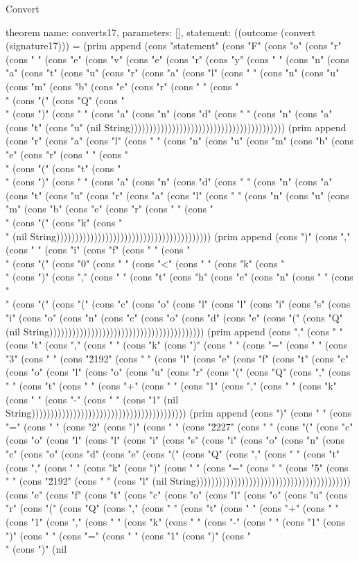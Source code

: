 \begin{lexlean}{Convert}
\begin{semanticmodule}
theorem{
  name: converts17,
  parameters: [],
  statement: ((outcome (convert (signature17))) = (prim append (cons "statement" (cons "F" (cons "o" (cons "r" (cons " " (cons "e" (cons "v" (cons "e" (cons "r" (cons "y" (cons " " (cons "n" (cons "a" (cons "t" (cons "u" (cons "r" (cons "a" (cons "l" (cons " " (cons "n" (cons "u" (cons "m" (cons "b" (cons "e" (cons "r" (cons " " (cons "\\" (cons "(" (cons "Q" (cons "\\" (cons ")" (cons " " (cons "a" (cons "n" (cons "d" (cons " " (cons "n" (cons "a" (cons "t" (cons "u" (nil String))))))))))))))))))))))))))))))))))))))))) (prim append (cons "r" (cons "a" (cons "l" (cons " " (cons "n" (cons "u" (cons "m" (cons "b" (cons "e" (cons "r" (cons " " (cons "\\" (cons "(" (cons "t" (cons "\\" (cons ")" (cons " " (cons "a" (cons "n" (cons "d" (cons " " (cons "n" (cons "a" (cons "t" (cons "u" (cons "r" (cons "a" (cons "l" (cons " " (cons "n" (cons "u" (cons "m" (cons "b" (cons "e" (cons "r" (cons " " (cons "\\" (cons "(" (cons "k" (cons "\\" (nil String))))))))))))))))))))))))))))))))))))))))) (prim append (cons ")" (cons "," (cons " " (cons "i" (cons "f" (cons " " (cons "\\" (cons "(" (cons "0" (cons " " (cons "<" (cons " " (cons "k" (cons "\\" (cons ")" (cons "," (cons " " (cons "t" (cons "h" (cons "e" (cons "n" (cons " " (cons "\\" (cons "(" (cons "(" (cons "c" (cons "o" (cons "l" (cons "l" (cons "i" (cons "s" (cons "i" (cons "o" (cons "n" (cons "c" (cons "o" (cons "d" (cons "e" (cons "(" (cons "Q" (nil String))))))))))))))))))))))))))))))))))))))))) (prim append (cons "," (cons " " (cons "t" (cons "," (cons " " (cons "k" (cons ")" (cons " " (cons "=" (cons " " (cons "3" (cons " " (cons "\u2192" (cons " " (cons "l" (cons "e" (cons "f" (cons "t" (cons "c" (cons "o" (cons "l" (cons "o" (cons "u" (cons "r" (cons "(" (cons "Q" (cons "," (cons " " (cons "t" (cons " " (cons "+" (cons " " (cons "1" (cons "," (cons " " (cons "k" (cons " " (cons "-" (cons " " (cons "1" (nil String))))))))))))))))))))))))))))))))))))))))) (prim append (cons ")" (cons " " (cons "=" (cons " " (cons "2" (cons ")" (cons " " (cons "\u2227" (cons " " (cons "(" (cons "c" (cons "o" (cons "l" (cons "l" (cons "i" (cons "s" (cons "i" (cons "o" (cons "n" (cons "c" (cons "o" (cons "d" (cons "e" (cons "(" (cons "Q" (cons "," (cons " " (cons "t" (cons "," (cons " " (cons "k" (cons ")" (cons " " (cons "=" (cons " " (cons "5" (cons " " (cons "\u2192" (cons " " (cons "l" (nil String))))))))))))))))))))))))))))))))))))))))) (cons "e" (cons "f" (cons "t" (cons "c" (cons "o" (cons "l" (cons "o" (cons "u" (cons "r" (cons "(" (cons "Q" (cons "," (cons " " (cons "t" (cons " " (cons "+" (cons " " (cons "1" (cons "," (cons " " (cons "k" (cons " " (cons "-" (cons " " (cons "1" (cons ")" (cons " " (cons "=" (cons " " (cons "1" (cons ")" (cons "\\" (cons ")" (nil }
\end{semanticmodule}
\end{lexlean}
